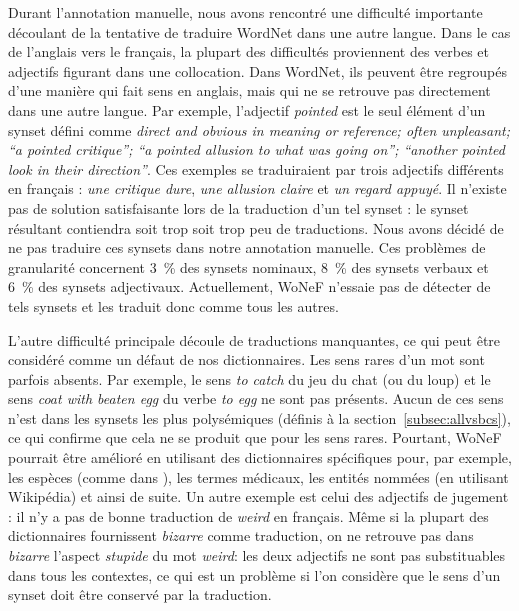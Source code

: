 Durant l'annotation manuelle, nous avons rencontré une difficulté importante
découlant de la tentative de traduire WordNet dans une autre langue. Dans le
cas de l'anglais vers le français, la plupart des difficultés proviennent des
verbes et adjectifs figurant dans une collocation. Dans WordNet, ils peuvent
être regroupés d'une manière qui fait sens en anglais, mais qui ne se retrouve
pas directement dans une autre langue. Par exemple, l'adjectif \textit{pointed}
est le seul élément d'un synset défini comme \textit{direct and obvious in
meaning or reference; often unpleasant; ``a pointed critique''; ``a pointed
allusion to what was going on''; ``another pointed look in their direction''}.
Ces exemples se traduiraient par trois adjectifs différents en français :
\textit{une critique dure}, \textit{une allusion claire} et \textit{un regard
appuyé}. Il n'existe pas de solution satisfaisante lors de la traduction d'un
tel synset : le synset résultant contiendra soit trop soit trop peu de
traductions. Nous avons décidé de ne pas traduire ces synsets dans notre
annotation manuelle. Ces problèmes de granularité concernent 3~\% des synsets
nominaux, 8~\% des synsets verbaux et 6~\% des synsets adjectivaux.
Actuellement, WoNeF n'essaie pas de détecter de tels synsets et les traduit
donc comme tous les autres.

L'autre difficulté principale découle de traductions manquantes, ce qui peut
être considéré comme un défaut de nos dictionnaires. Les sens rares d'un mot
sont parfois absents. Par exemple, le sens \textit{to catch} du jeu du chat (ou
du loup) et le sens \textit{coat with beaten egg} du verbe \textit{to egg} ne
sont pas présents. Aucun de ces sens n'est dans les synsets les plus
polysémiques (définis à la section~\ref{subsec:allvsbcs}), ce qui confirme que
cela ne se produit que pour les sens rares. Pourtant, WoNeF pourrait être
amélioré en utilisant des dictionnaires spécifiques pour, par exemple, les
espèces (comme dans \cite{sagot2008construction}), les termes médicaux, les
entités nommées (en utilisant Wikipédia) et ainsi de suite. Un autre exemple
est celui des adjectifs de jugement : il n'y a pas de bonne traduction de
\textit{weird} en français. Même si la plupart des dictionnaires fournissent
\textit{bizarre} comme traduction, on ne retrouve pas dans \textit{bizarre}
l'aspect \textit{stupide} du mot \textit{weird}: les deux adjectifs ne sont pas
substituables dans tous les contextes, ce qui est un problème si l'on considère
que le sens d'un synset doit être conservé par la traduction.

